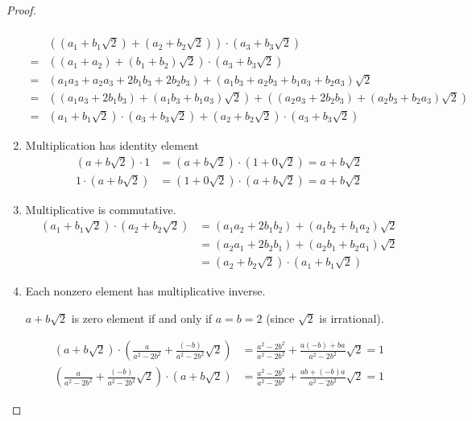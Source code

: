 \begin{proof}
\begin{enumerate}[label = (\arabic*)]
\begin{align*}
		      \end{align*}
		      \begin{align*}
			        & \left((a_{1} + b_{1}\sqrt{2}) + (a_{2} + b_{2}\sqrt{2})\right)\cdot (a_{3} + b_{3}\sqrt{2})                                                               \\
			      = & \left((a_{1} + a_{2}) + (b_{1} + b_{2})\sqrt{2}\right)\cdot (a_{3} + b_{3}\sqrt{2})                                                                       \\
			      = & \left(a_{1}a_{3} + a_{2}a_{3} + 2b_{1}b_{3} + 2b_{2}b_{3}\right) + (a_{1}b_{3} + a_{2}b_{3} + b_{1}a_{3} + b_{2}a_{3})\sqrt{2}                            \\
			      = & \left((a_{1}a_{3} + 2b_{1}b_{3}) + (a_{1}b_{3} + b_{1}a_{3})\sqrt{2}\right) + \left((a_{2}a_{3} + 2b_{2}b_{3}) + (a_{2}b_{3} + b_{2}a_{3})\sqrt{2}\right) \\
			      = & (a_{1} + b_{1}\sqrt{2})\cdot (a_{3} + b_{3}\sqrt{2}) + (a_{2} + b_{2}\sqrt{2})\cdot (a_{3} + b_{3}\sqrt{2})
		      \end{align*}
		\item Multiplication has identity element
		      \begin{align*}
			      (a + b\sqrt{2})\cdot 1 & = (a + b\sqrt{2})\cdot (1 + 0\sqrt{2}) = a + b\sqrt{2} \\
			      1\cdot (a + b\sqrt{2}) & = (1 + 0\sqrt{2})\cdot (a + b\sqrt{2}) = a + b\sqrt{2}
		      \end{align*}
		\item Multiplicative is commutative.
		      \begin{align*}
			      (a_{1} + b_{1}\sqrt{2})\cdot (a_{2} + b_{2}\sqrt{2}) & = (a_{1}a_{2} + 2b_{1}b_{2}) + (a_{1}b_{2} + b_{1}a_{2})\sqrt{2} \\
			                                                           & = (a_{2}a_{1} + 2b_{2}b_{1}) + (a_{2}b_{1} + b_{2}a_{1})\sqrt{2} \\
			                                                           & = (a_{2} + b_{2}\sqrt{2})\cdot (a_{1} + b_{1}\sqrt{2})
		      \end{align*}
		\item Each nonzero element has multiplicative inverse.

		      $a + b\sqrt{2}$ is zero element if and only if $a = b = 2$ (since $\sqrt{2}$ is irrational).

		      \begin{align*}
			      (a + b\sqrt{2})\cdot \left( \frac{a}{a^{2} - 2b^{2}} + \frac{(-b)}{a^{2} - 2b^{2}}\sqrt{2} \right) & = \frac{a^{2} - 2b^{2}}{a^{2} - 2b^{2}} + \frac{a(-b) + ba}{a^{2} - 2b^{2}}\sqrt{2} = 1 \\
			      \left( \frac{a}{a^{2} - 2b^{2}} + \frac{(-b)}{a^{2} - 2b^{2}}\sqrt{2} \right)\cdot (a + b\sqrt{2}) & = \frac{a^{2} - 2b^{2}}{a^{2} - 2b^{2}} + \frac{ab + (-b)a}{a^{2} - 2b^{2}}\sqrt{2} = 1
		      \end{align*}
	\end{enumerate}
\end{proof}

